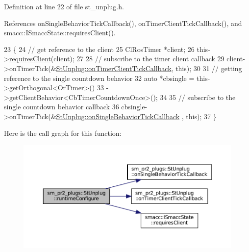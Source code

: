 Definition at line 22 of file st\+\_\+unplug.\+h.



References on\+Single\+Behavior\+Tick\+Callback(), on\+Timer\+Client\+Tick\+Callback(), and smacc\+::\+I\+Smacc\+State\+::requires\+Client().


\begin{DoxyCode}
23     \{
24         \textcolor{comment}{// get reference to the client}
25         ClRosTimer *client;
26         this->\hyperlink{classsmacc_1_1ISmaccState_a7f95c9f0a6ea2d6f18d1aec0519de4ac}{requiresClient}(client);
27 
28         \textcolor{comment}{// subscribe to the timer client callback}
29         client->onTimerTick(&\hyperlink{structsm__pr2__plugs_1_1StUnplug_ac3f670b50be1fcd8e3dc0f28f5fafab9}{StUnplug::onTimerClientTickCallback}, \textcolor{keyword}{this});
30 
31         \textcolor{comment}{// getting reference to the single countdown behavior}
32         \textcolor{keyword}{auto} *cbsingle = this->getOrthogonal<OrTimer>()
33                              ->getClientBehavior<CbTimerCountdownOnce>();
34 
35         \textcolor{comment}{// subscribe to the single countdown behavior callback}
36         cbsingle->onTimerTick(&\hyperlink{structsm__pr2__plugs_1_1StUnplug_a2f48107152c97948f7925c6d6225b4bf}{StUnplug::onSingleBehaviorTickCallback}
      , \textcolor{keyword}{this});
37     \}
\end{DoxyCode}
Here is the call graph for this function\+:
\nopagebreak
\begin{figure}[H]
\begin{center}
\leavevmode
\includegraphics[width=350pt]{structsm__pr2__plugs_1_1StUnplug_a9a9dac6ed575453e3bbfb115f99277be_cgraph}
\end{center}
\end{figure}
\mbox{\label{structsm__pr2__plugs_1_1StUnplug_aef539ea0c8d9ebf2ee46a69ca5db75be}} 
